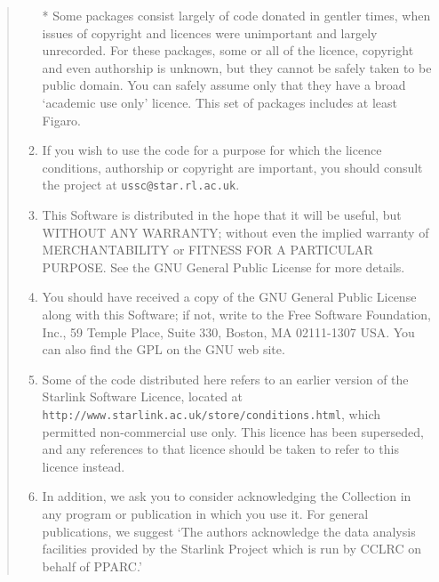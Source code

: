 \documentclass[twoside,11pt]{article}
\newcommand{\htmladdnormallink}[2]{#1}
\renewcommand{\_}{\texttt{\symbol{95}}}
\begin{document}
\begin{quote}
\begin{enumerate}
  * Some packages consist largely of code donated in gentler times,
    when issues of copyright and licences were unimportant and
    largely unrecorded.  For these packages, some or all of the
    licence, copyright and even authorship is unknown, but they
    cannot be safely taken to be public domain.  You can safely
    assume only that they have a broad `academic use only' licence.
    This set of packages includes at least Figaro.

\item If you wish to use the code for a purpose for which the licence
 conditions, authorship or copyright are important, you should 
 consult the project at \texttt{ussc@star.rl.ac.uk}.

\item This Software is distributed in the hope that it will be useful, but 
 WITHOUT ANY WARRANTY; without even the implied warranty of 
 MERCHANTABILITY or FITNESS FOR A PARTICULAR PURPOSE. See the GNU General
 Public License for more details.

\item You should have received a copy of the GNU General Public License along 
 with this Software; if not, write to the Free Software Foundation, Inc., 
 59 Temple Place, Suite 330, Boston, MA 02111-1307 USA. You can also find 
 the GPL on the GNU web site.
 
\item Some of the code distributed here refers to an earlier version of
 the Starlink Software Licence, located at
 \htmladdnormallink{\texttt{http://www.starlink.ac.uk/store/conditions.html}}{http://www.starlink.ac.uk/store/conditions.html}, 
 which permitted non-commercial use only.  This licence has been
 superseded, and any references to that licence should be taken to
 refer to this licence instead.

\item In addition, we ask you to consider acknowledging the Collection in any
 program or publication in which you use it.  For general publications,
 we suggest `The authors acknowledge the data analysis facilities
 provided by the Starlink Project which is run by CCLRC on behalf
 of PPARC.'
\end{enumerate}
\end{quote}
\end{document}
